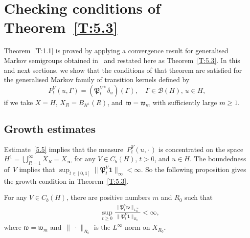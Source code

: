 \documentclass[10pt]{amsart}
\theoremstyle{definition}\newtheorem{defi}[theo]{Definition}\newtheorem{rema}[theo]{Remark}\newtheorem{exam}[theo]{Example}\newtheorem{exem}[theo]{Example}\newtheorem{nota}[theo]{Notation}
\newcommand{\mek}{{\mathbf 1}}
\newcommand{\ty}{\infty}
\newcommand{\de}{\delta}
\newcommand{\wwww}{{\mathfrak w}}
\newcommand{\PPPP}{{\mathfrak P}}
\newcommand{\BBBBB}{{\mathcal B}}
\begin{document}
\section{Checking conditions of Theorem~\ref{T:5.3}}\label{S:2}

Theorem~\ref{T:1.1} is proved by applying a convergence result for generalised Markov semigroups obtained in~\cite{JNPS-2014, MN-2015} and restated here as Theorem~\ref{T:5.3}. In this and next sections, we show that the conditions of that theorem are satisfied for the generalised Markov family of transition kernels defined by
\[
P_t^V(u,\Gamma)=(\PPPP_t^{V*} \de_u) (\Gamma),\quad \Gamma\in \BBBBB(H), \, u\in H,
\]
if we take $X=H$, $X_R= B_{H^1}(R)$, and~$\wwww= \wwww_m$ with sufficiently large $m\ge1$.

\subsection{Growth estimates}

Estimate~\eqref{5.5} implies that the measure~$P_{t}^V(u,{\cdot\,})$ is concentrated on the space $H^1=\bigcup_{R=1}^\ty X_R=X_\ty$ for any $V\in C_b(H)$, $t>0$, and $u\in H$. The boundedness of~$V$ implies that $\sup_{t\in[0,1]}\|\PPPP_t^V{\mek}\|_\ty<\ty$. So the following proposition gives the growth condition in Theorem~\ref{T:5.3}.

\begin{prop}\label{P:2.4}
For any $V\in C_b(H)$, there are positive numbers $m$ and $R_0$ such that
\begin{align}
&\sup_{t\ge0}
\frac{\|\PPPP_t^V\wwww\|_{L_{\wwww}^\infty}}{\|\PPPP_t^V{\mek}\|_{R_0}}<\infty,\label{a5.8}
\end{align}
where $\wwww=\wwww_m$ and~$\|{\,\cdot\,}\|_{R_0}$ is the $L^\ty$ norm on $X_{R_0}$.
\end{prop}
\end{document}
